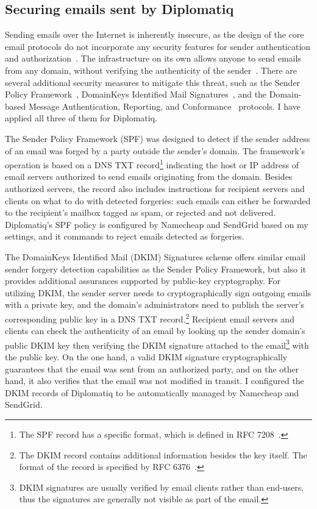 \subsection{Securing emails sent by Diplomatiq}

Sending emails over the Internet is inherently insecure, as the design of the core email protocols do not incorporate any security features for sender authentication and authorization~\cite{foster2015security}. The infrastructure on its own allows anyone to send emails from any domain, without verifying the authenticity of the sender~\cite{rfc5321}. There are several additional security measures to mitigate this threat, such as the Sender Policy Framework~\cite{rfc7208}, DomainKeys Identified Mail Signatures~\cite{rfc6376}, and the Domain-based Message Authentication, Reporting, and Conformance~\cite{rfc7489} protocols. I have applied all three of them for Diplomatiq.

The Sender Policy Framework (SPF) was designed to detect if the sender address of an email was forged by a party outside the sender's domain. The framework's operation is based on a DNS TXT record\footnote{The SPF record has a specific format, which is defined in RFC 7208~\cite{rfc7208}.} indicating the host or IP address of email servers authorized to send emails originating from the domain. Besides authorized servers, the record also includes instructions for recipient servers and clients on what to do with detected forgeries: such emails can either be forwarded to the recipient's mailbox tagged as spam, or rejected and not delivered. Diplomatiq's SPF policy is configured by Namecheap and SendGrid based on my settings, and it commands to reject emails detected as forgeries.

The DomainKeys Identified Mail (DKIM) Signatures scheme offers similar email sender forgery detection capabilities as the Sender Policy Framework, but also it provides additional assurances supported by public-key cryptography. For utilizing DKIM, the sender server needs to cryptographically sign outgoing emails with a private key, and the domain's administrators need to publish the server's corresponding public key in a DNS TXT record.\footnote{The DKIM record contains additional information besides the key itself. The format of the record is specified by RFC 6376~\cite{rfc6376}.} Recipient email servers and clients can check the authenticity of an email by looking up the sender domain's public DKIM key then verifying the DKIM signature attached to the email\footnote{DKIM signatures are usually verified by email clients rather than end-users, thus the signatures are generally not visible as part of the email.} with the public key. On the one hand, a valid DKIM signature cryptographically guarantees that the email was sent from an authorized party, and on the other hand, it also verifies that the email was not modified in transit. I configured the DKIM records of Diplomatiq to be automatically managed by Namecheap and SendGrid.


